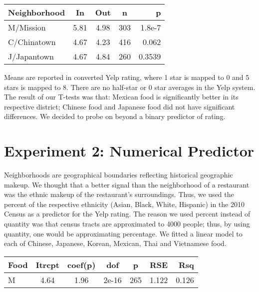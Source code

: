 \documentclass[11pt,twocolumn]{article}
\begin{document}
\begin{center}
  \begin{tabular}{| l | c | c | c | r | }
    \hline
    Neighborhood & In & Out & n & p \\ \hline
    M/Mission & 5.81 & 4.98 & 303 & 1.8e-7 \\ \hline \hline
    C/Chinatown & 4.67 & 4.23 & 416 & 0.062 \\ \hline
    J/Japantown & 4.67 & 4.84 & 260 & 0.3539 \\
    \hline
  \end{tabular}
\end{center}

Means are reported in converted Yelp rating, where 1 star is mapped to 0 and 5 stars is mapped to 8. There are no half-star or 0 star averages in the Yelp system. The result of our T-tests was that: Mexican food is significantly better in its respective district; Chinese food and Japanese food did not have significant differences. We decided to probe on beyond a binary predictor of rating.

\section{Experiment 2: Numerical Predictor}

Neighborhoods are geographical boundaries reflecting historical geographic makeup. We thought that a better signal than the neighborhood of a restaurant was the ethnic makeup of the restaurant's surroundings. Thus, we used the percent of the respective ethnicity (Asian, Black, White, Hispanic) in the 2010 Census as a predictor for the Yelp rating. The reason we used percent instead of quantity was that census tracts are approximated to 4000 people; thus, by using quantity, one would be approximating percentage. We fitted a linear model to each of Chinese, Japanese, Korean, Mexican, Thai and Vietnamese food. 

\begin{center}
  \begin{tabular}{| l | c | c | c | c | c | r | }
    \hline
    Food & Itrcpt & coef(p) & dof & p & RSE & Rsq \\ \hline
    M & 4.64 & 1.96 & 2e-16 & 265 & 1.122 & 0.126 \\ \hline

    \hline
  \end{tabular}
\end{center}
\end{document}
